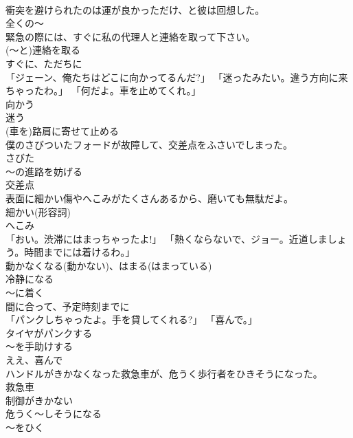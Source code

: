 \documentclass[8pt]{extreport}
\begin{document}
\begin{CJK}{UTF8}{min}
\\	衝突を避けられたのは運が良かっただけ、と彼は回想した。	
\\	全くの～
\\	緊急の際には、すぐに私の代理人と連絡を取って下さい。	
\\	(～と)連絡を取る 
\\	すぐに、ただちに
\\	「ジェーン、俺たちはどこに向かってるんだ?」 「迷ったみたい。違う方向に来ちゃったわ。」 「何だよ。車を止めてくれ。」	
\\	向かう 
\\	迷う 
\\	(車を)路肩に寄せて止める
\\	僕のさびついたフォードが故障して、交差点をふさいでしまった。	
\\	さびた 
\\	～の進路を妨げる 
\\	交差点
\\	表面に細かい傷やへこみがたくさんあるから、磨いても無駄だよ。	
\\	細かい(形容詞) 
\\	へこみ
\\	「おい。渋滞にはまっちゃったよ!」 「熱くならないで、ジョー。近道しましょう。時間までには着けるわ。」	
\\	動かなくなる(動かない)、はまる(はまっている) 
\\	冷静になる 
\\	～に着く 
\\	間に合って、予定時刻までに
\\	「パンクしちゃったよ。手を貸してくれる?」 「喜んで。」	
\\	タイヤがパンクする 
\\	～を手助けする 
\\	ええ、喜んで
\\	ハンドルがきかなくなった救急車が、危うく歩行者をひきそうになった。	
\\	救急車 
\\	制御がきかない 
\\	危うく～しそうになる 
\\	～をひく
\end{CJK}
\end{document}
